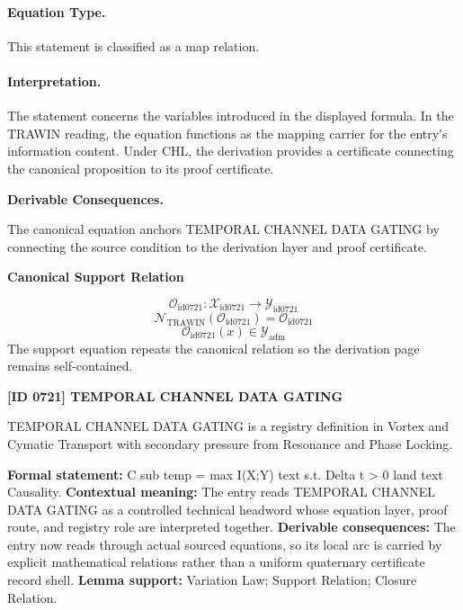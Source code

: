 \paragraph{Equation Type.}
This statement is classified as a map relation.

\paragraph{Interpretation.}
The statement concerns the variables introduced in the displayed formula. In the TRAWIN reading, the equation functions as the mapping carrier for the entry’s information content. Under CHL, the derivation provides a certificate connecting the canonical proposition to its proof certificate.

\par\vspace{0.35em}
\noindent\textbf{Derivable Consequences.}\quad
\begingroup
\footnotesize
\raggedright
The canonical equation anchors TEMPORAL CHANNEL DATA GATING by connecting the source condition to the derivation layer and proof certificate.
\par\endgroup

\noindent\textbf{Canonical Support Relation}\par
\[
\mathcal{O}_{\mathrm{id0721}}:\mathcal{X}_{\mathrm{id0721}}\longrightarrow\mathcal{Y}_{\mathrm{id0721}}
\]
\[
\mathcal{N}_{\mathrm{TRAWIN}}(\mathcal{O}_{\mathrm{id0721}})=\mathcal{O}_{\mathrm{id0721}}
\]
\[
\mathcal{O}_{\mathrm{id0721}}(x)\in\mathcal{Y}_{\mathrm{adm}}
\]
\noindent The support equation repeats the canonical relation so the derivation page remains self-contained.\par

\clearpage
\noindent\textbf{[ID 0721] TEMPORAL CHANNEL DATA GATING}\par
\vspace{0.35em}
\begingroup\small
{}
TEMPORAL CHANNEL DATA GATING is a registry definition in Vortex and Cymatic Transport with secondary pressure from Resonance and Phase Locking.

\begingroup\footnotesize\setlength{\emergencystretch}{3em}\sloppy
\textbf{Formal statement:} C sub temp = max I(X;Y) text s.t. Delta t > 0 land text Causality. \textbf{Contextual meaning:} The entry reads TEMPORAL CHANNEL DATA GATING as a controlled technical headword whose equation layer, proof route, and registry role are interpreted together. \textbf{Derivable consequences:} The entry now reads through actual sourced equations, so its local arc is carried by explicit mathematical relations rather than a uniform quaternary certificate record shell. \textbf{Lemma support:} Variation Law; Support Relation; Closure Relation.\par
\endgroup


